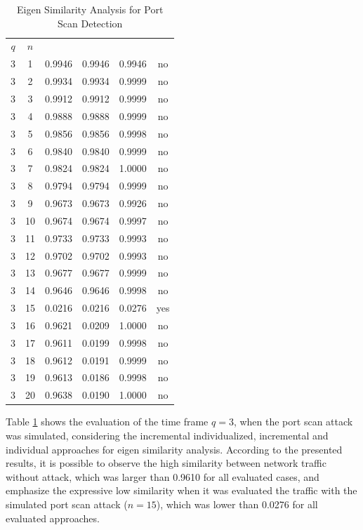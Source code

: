 \begin{table}[h!]
  \centering
  \footnotesize
  \caption{Eigen Similarity Analysis for Port Scan Detection}
  \label{tab:2.05}
  \begin{tabular}{ c c c c c c }
	\toprule
	\multirow{2}{*}{\pmb{Time Frame} $q$} &\multirow{2}{*}{\pmb{Time} $n$}   &\multicolumn{3}{c}{\pmb{Similarity Analysis}} &\multirow{2}{*}{\pmb{Ground Truth}}\\ 
			\hhline{~~---~}
			& &\pmb{Incremental Individualized} &\pmb{Incremental} &\pmb{Individual}\\
	\midrule
	3 &1 &0.9946 &0.9946 &0.9946 &no \\
	3 &2 &0.9934 &0.9934 &0.9999 &no \\
	3 &3 &0.9912 &0.9912 &0.9999 &no \\
	3 &4 &0.9888 &0.9888 &0.9999 &no \\
	3 &5 &0.9856 &0.9856 &0.9998 &no \\
	3 &6 &0.9840 &0.9840 &0.9999 &no \\
	3 &7 &0.9824 &0.9824 &1.0000 &no \\
	3 &8 &0.9794 &0.9794 &0.9999 &no \\
	3 &9 &0.9673 &0.9673 &0.9926 &no \\
	3 &10 &0.9674 &0.9674 &0.9997 &no \\
	3 &11 &0.9733 &0.9733 &0.9993 &no \\
	3 &12 &0.9702 &0.9702 &0.9993 &no \\
	3 &13 &0.9677 &0.9677 &0.9999 &no \\
	3 &14 &0.9646 &0.9646 &0.9998 &no \\
	3 &15 &0.0216 &0.0216 &0.0276 &yes \\
	3 &16 &0.9621 &0.0209 &1.0000 &no \\
	3 &17 &0.9611 &0.0199 &0.9998 &no \\
	3 &18 &0.9612 &0.0191 &0.9999 &no \\
	3 &19 &0.9613 &0.0186 &0.9998 &no \\
	3 &20 &0.9638 &0.0190 &1.0000 &no \\
    \bottomrule
  \end{tabular}
\end{table}

Table \ref{tab:2.05} shows the evaluation of the time frame $q=3$, when the port scan attack was simulated, considering the incremental individualized, incremental and individual approaches for eigen similarity analysis. According to the presented results, it is possible to observe the high similarity between network traffic without attack, which was larger than 0.9610 for all evaluated cases, and emphasize the expressive low similarity when it was evaluated the traffic with the simulated port scan attack ($n=15$), which was lower than 0.0276 for all evaluated approaches.

